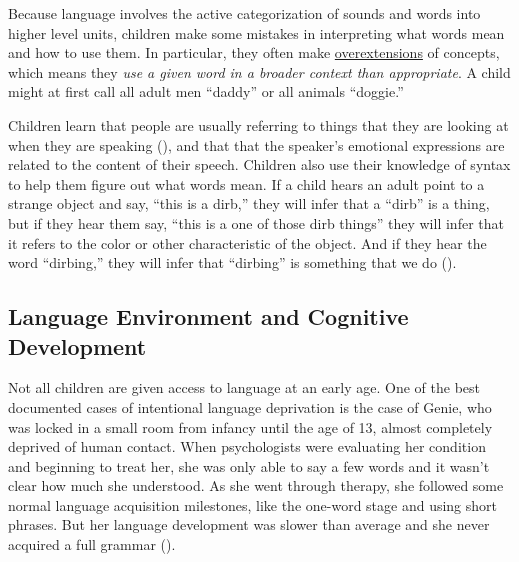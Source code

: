\documentclass[
]{krantz}
\begin{document}
Because language involves the active categorization of sounds and words into higher level units, children make some mistakes in interpreting what words mean and how to use them. In particular, they often make \hyperref[overextensions]{overextensions} of concepts, which means they \emph{use a given word in a broader context than appropriate}. A child might at first call all adult men ``daddy'' or all animals ``doggie.''

Children learn that people are usually referring to things that they are looking at when they are speaking (), and that that the speaker's emotional expressions are related to the content of their speech. Children also use their knowledge of syntax to help them figure out what words mean. If a child hears an adult point to a strange object and say, ``this is a dirb,'' they will infer that a ``dirb'' is a thing, but if they hear them say, ``this is a one of those dirb things'' they will infer that it refers to the color or other characteristic of the object. And if they hear the word ``dirbing,'' they will infer that ``dirbing'' is something that we do ().

\subsection*{Language Environment and Cognitive Development}\label{language-environment-and-cognitive-development}


Not all children are given access to language at an early age. One of the best documented cases of intentional language deprivation is the case of Genie, who was locked in a small room from infancy until the age of 13, almost completely deprived of human contact. When psychologists were evaluating her condition and beginning to treat her, she was only able to say a few words and it wasn't clear how much she understood. As she went through therapy, she followed some normal language acquisition milestones, like the one-word stage and using short phrases. But her language development was slower than average and she never acquired a full grammar ().
\end{document}
